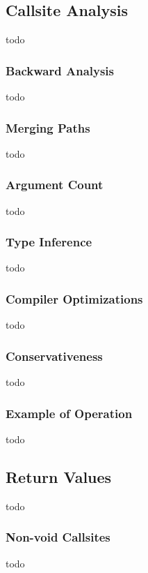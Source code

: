 \subsection{Callsite Analysis}
\label{Callee Analysis}
todo

\subsubsection{Backward Analysis}
\label{Backward Analysis}
todo

\subsubsection{Merging Paths}
\label{Merging Paths}
todo

\subsubsection{Argument Count}
\label{Argument Count}
todo

\subsubsection{Type Inference}
\label{Type Inference}
todo

\subsubsection{Compiler Optimizations}
\label{Compiler Optimizations}
todo

\subsubsection{Conservativeness}
\label{Conservativeness}
todo

\subsubsection{Example of Operation}
\label{Example of Operation}
todo



\subsection{Return Values}
\label{Return Values}
todo

\subsubsection{Non-void Callsites}
\label{Non-void Callsites}
todo


